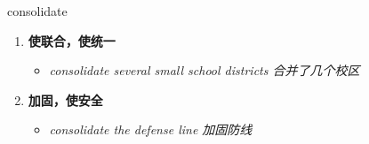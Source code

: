 
\begin{frame}
{\huge consolidate}
\begin{center}
\begin{enumerate}\Large
  \item \textbf{使联合，使统一}
  \begin{itemize}
    \item \em{\Large{consolidate several small school districts 合并了几个校区}}
  \end{itemize}
  \item \textbf{加固，使安全}
  \begin{itemize}
    \item \em{\Large{consolidate the defense line 加固防线}}
  \end{itemize}
\end{enumerate}
\end{center}
\end{frame}
